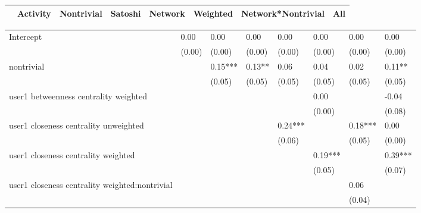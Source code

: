 \begin{table*}
\caption{Volume AND}
\begin{center}
\begin{tabular}{lccccccc}
\hline
                                               & Activity & Nontrivial & Satoshi & Network & Weighted & Network*Nontrivial &   All     \\
\hline
\hline
\end{tabular}
\begin{tabular}{llllllll}
Intercept                                      & 0.00     & 0.00       & 0.00    & 0.00    & 0.00     & 0.00               & 0.00      \\
                                               & (0.00)   & (0.00)     & (0.00)  & (0.00)  & (0.00)   & (0.00)             & (0.00)    \\
nontrivial                                     &          & 0.15***    & 0.13**  & 0.06    & 0.04     & 0.02               & 0.11**    \\
                                               &          & (0.05)     & (0.05)  & (0.05)  & (0.05)   & (0.05)             & (0.05)    \\
user1 betweenness centrality weighted          &          &            &         &         & 0.00     &                    & -0.04     \\
                                               &          &            &         &         & (0.00)   &                    & (0.08)    \\
user1 closeness centrality unweighted          &          &            &         & 0.24*** &          & 0.18***            & 0.00      \\
                                               &          &            &         & (0.06)  &          & (0.05)             & (0.00)    \\
user1 closeness centrality weighted            &          &            &         &         & 0.19***  &                    & 0.39***   \\
                                               &          &            &         &         & (0.05)   &                    & (0.07)    \\
user1 closeness centrality weighted:nontrivial &          &            &         &         &          & 0.06               &           \\
                                               &          &            &         &         &          & (0.04)             &           \\

\end{tabular}
\end{center}
\end{table*}

